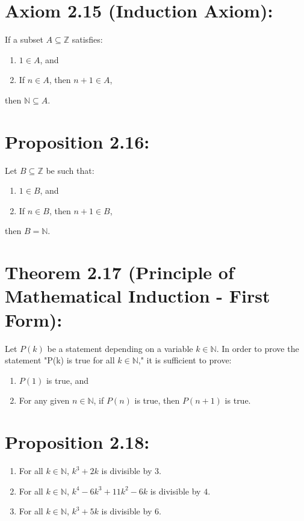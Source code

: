 \section*{Axiom 2.15 (Induction Axiom):}
If a subset $A \subseteq \mathbb{Z}$ satisfies:
\begin{enumerate}
    \item $1 \in A$, and
    \item If $n \in A$, then $n+1 \in A$,
\end{enumerate}
then $\mathbb{N} \subseteq A$.

\section*{Proposition 2.16:}
Let $B \subseteq \mathbb{Z}$ be such that:
\begin{enumerate}
    \item $1 \in B$, and
    \item If $n \in B$, then $n+1 \in B$,
\end{enumerate}
then $B = \mathbb{N}$.

\section*{Theorem 2.17 (Principle of Mathematical Induction - First Form):}
Let $P(k)$ be a statement depending on a variable $k \in \mathbb{N}$. In order to prove the statement "P(k) is true for all $k \in \mathbb{N}$," it is sufficient to prove:
\begin{enumerate}
    \item $P(1)$ is true, and
    \item For any given $n \in \mathbb{N}$, if $P(n)$ is true, then $P(n+1)$ is true.
\end{enumerate}

\section*{Proposition 2.18:}
\begin{enumerate}[label=(\roman*)]
    \item For all $k \in \mathbb{N}$, $k^3+2k$ is divisible by $3$.
    \item For all $k \in \mathbb{N}$, $k^4-6k^3+11k^2-6k$ is divisible by $4$.
    \item For all $k \in \mathbb{N}$, $k^3+5k$ is divisible by $6$.
\end{enumerate}

